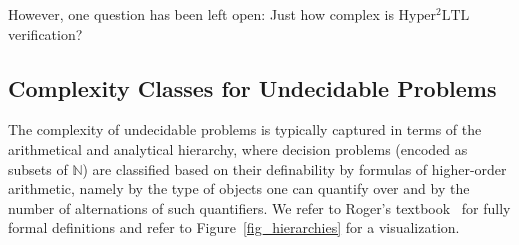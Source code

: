 \documentclass[dvipsnames,10pt,a4paper]{amsart}
\theoremstyle{definition}
\theoremstyle{remark}
\newcommand{\nats}{\mathbb{N}}
\newcommand{\sohyltl}{\mathrm{Hyper^2LTL}\xspace}
\begin{document}
However, one question has been left open: Just how complex is $\sohyltl$ verification?

\subsection{Complexity Classes for Undecidable Problems}
The complexity of undecidable problems is typically captured in terms of the arithmetical and analytical hierarchy, where decision problems (encoded as subsets of $\nats$) are classified based on their definability by formulas of higher-order arithmetic, namely by the type of objects one can quantify over and by the number of alternations of such quantifiers.
We refer to Roger's textbook~\cite{Rogers87} for fully formal definitions and refer to Figure~\ref{fig_hierarchies} for a visualization.
\end{document}
